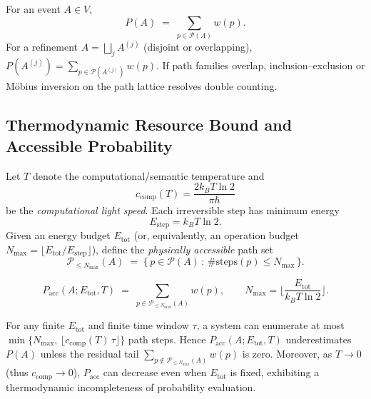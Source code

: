 \begin{definition}
\label{def:spectral-path-prob}
For an event $A\in V$,
\[
P(A)\;=\;\sum_{p\in\mathcal{P}(A)} w(p).
\]
For a refinement $A=\bigsqcup_{j}A^{(j)}$ (disjoint or overlapping),
\(
P\!\left(A^{(j)}\right)=\sum_{p\in\mathcal{P}(A^{(j)})}w(p).
\)
If path families overlap, inclusion–exclusion or Möbius inversion on the path lattice resolves double counting.
\end{definition}

\subsection{Thermodynamic Resource Bound and Accessible Probability}
\label{subsec:thermo-bound}

Let $T$ denote the computational/semantic temperature and
\begin{equation}
c_{\mathrm{comp}}(T)=\frac{2k_B T\ln 2}{\pi\hbar}
\label{eq:ccomp}
\end{equation}
be the \emph{computational light speed}. Each irreversible step has minimum energy
\begin{equation}
E_{\mathrm{step}}=k_B T\ln 2.
\label{eq:landauer-step}
\end{equation}
Given an energy budget $E_{\mathrm{tot}}$ (or, equivalently, an operation budget
$N_{\max}=\lfloor E_{\mathrm{tot}}/E_{\mathrm{step}}\rfloor$), define the \emph{physically accessible} path set
\[
\mathcal{P}_{\le N_{\max}}(A) \;=\; \{\,p\in\mathcal{P}(A)\,:\, \#\mathrm{steps}(p)\le N_{\max}\,\}.
\]

\begin{definition}
\label{def:accessible-prob}
\begin{equation}
P_{\mathrm{acc}}(A;E_{\mathrm{tot}},T)
\;=\;
\sum_{p\in\mathcal{P}_{\le N_{\max}}(A)} w(p),
\qquad
N_{\max}=\Big\lfloor \frac{E_{\mathrm{tot}}}{k_B T\ln 2}\Big\rfloor.
\label{eq:Pacc}
\end{equation}
\end{definition}

\begin{theorem}
\label{thm:phys-bounded-prob}
For any finite $E_{\mathrm{tot}}$ and finite time window $\tau$, a system can enumerate
at most $\min\!\big\{N_{\max},\,\lfloor c_{\mathrm{comp}}(T)\,\tau\rfloor\big\}$ path steps.
Hence $P_{\mathrm{acc}}(A;E_{\mathrm{tot}},T)$ underestimates $P(A)$ unless the residual tail
$\sum_{p\notin\mathcal{P}_{\le N_{\max}}(A)} w(p)$ is zero. Moreover, as $T\!\to\!0$ (thus $c_{\mathrm{comp}}\!\to\!0$),
$P_{\mathrm{acc}}$ can decrease even when $E_{\mathrm{tot}}$ is fixed, exhibiting a thermodynamic
incompleteness of probability evaluation.
\end{theorem}

